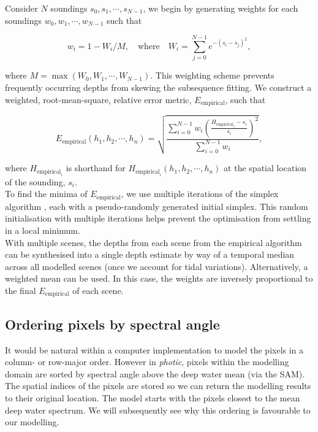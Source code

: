 \documentclass[12pt]{article}
\numberwithin{equation}{section}
\begin{document}
Consider $N$ soundings $s_0, s_1, \cdots, s_{N-1}$, we begin by generating weights 
for each soundings $w_0, w_1, \cdots, w_{N-1}$ such that 
\begin{linenomath}
\begin{equation*}
w_i = 1 - W_i/M, \quad \text{where} \quad W_i = \sum\limits_{j=0}^{N-1} e^{-\left(s_i - s_j\right)^2},
\end{equation*}
\end{linenomath}

\noindent where $M = \max(W_0, W_1, \cdots, W_{N-1})$. This weighting scheme 
prevents frequently occurring depths from skewing the subsequence fitting. 
We construct a weighted, root-mean-square, relative error metric, 
$E_{\text{empirical}}$, such that 
\begin{linenomath}
\begin{equation*}
E_{\text{empirical}}\left(h_1, h_2, \cdots, h_n\right) = 
\sqrt{\frac{\sum\limits_{i=0}^{N-1} w_i \left(\frac{H_{\text{empirical}_i} - s_i}{s_i}\right)^2}{\sum\limits_{i=0}^{N-1} w_i}},
\end{equation*}
\end{linenomath} 
where $H_{\text{empirical}_i}$ is shorthand for 
$H_{\text{empirical}_i}\left(h_1,h_2,\cdots,h_n\right)$ at the spatial location 
of the sounding, $s_i$. \\

To find the minima of $E_{\text{empirical}}$, we use multiple iterations of the 
simplex algorithm \cite{oneil1971}, each with a pseudo-randomly generated initial 
simplex. This random initialisation with multiple iterations helps prevent the 
optimisation from settling in a local minimum.  \\

With multiple scenes, the depths from each scene from the empirical algorithm can 
be synthesised into a single depth estimate by way of a temporal median across 
all modelled scenes (once we account for tidal variations). Alternatively, a 
weighted mean can be used. In this case, the weights are inversely proportional 
to the final $E_{\text{empirical}}$ of each scene. 

	\subsection{Ordering pixels by spectral angle}

It would be natural within a computer implementation to model the pixels in a column- or 
row-major order. However in \textit{photic}, pixels within the modelling domain are 
sorted by spectral angle above the deep water mean (via the SAM). The spatial indices 
of the pixels are stored so we can return the modelling results to their original 
location. The model starts with the pixels closest to the mean deep water spectrum. 
We will subsequently see why this ordering is favourable to our modelling. 
\end{document}
